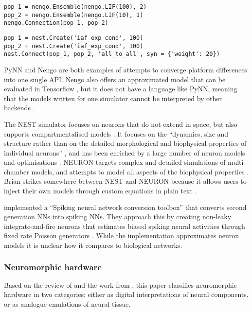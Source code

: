 \documentclass[report.tex]{subfiles}
\begin{document}
\begin{lstlisting}
pop_1 = nengo.Ensemble(nengo.LIF(100), 2)
pop_2 = nengo.Ensemble(nengo.LIF(10), 1)
nengo.Connection(pop_1, pop_2)
\end{lstlisting} \label{code:nengo}

\begin{lstlisting}
pop_1 = nest.Create('iaf_exp_cond', 100)
pop_2 = nest.Create('iaf_exp_cond', 100)
nest.Connect(pop_1, pop_2, 'all_to_all', syn = {'weight': 20})
\end{lstlisting} \label{code:nengo}

PyNN and Nengo are both examples of
attempts to converge platform differences into one single \gls{API}.
Nengo also offers an approximated model that can be evaluated in Tensorflow
\cite{Hunsberger2015}, but it does not have a language like PyNN, meaning
that the models written for one simulator cannot be interpreted by other
backends \cite{Nengo2018}.

The NEST simulator focuses on neurons that do not extend in space, 
but also supports compartmentalised models \cite{Gewaltig2007}.
It focuses on the ``dynamics, size and structure rather than on the detailed
morphological and biophysical properties of individual neurons''
\cite{Gewaltig2007}, and has been enriched by a large number of neuron models
and optimisations \cite{Blundell2018}.
NEURON targets complex and detailed simulations of multi-chamber models, and
attempts to model all aspects of the biophysical properties \cite{Carnevale2007}.
Brian strikes somewhere between NEST and NEURON because it allows users to
inject their own models through custom equations in plain text \cite{Goodman2013}.

\textcite{Rueckauer2017} implemented a ``Spiking neural network conversion
toolbox'' that converts second generation \gls{NN}s into
spiking \gls{NN}s.
They approach this by creating non-leaky integrate-and-fire
 neurons that estimates biased spiking neural activities through
fixed rate Poisson generators
\cite{Rueckauer2017}.
While the implementation approximates neuron models it is unclear
how it compares to biological networks.

\subsubsection{Neuromorphic hardware}
Based on the review of \textcite{Walter2015} and the work from
\cite{Lin2018}, this paper classifies neuromorphic hardware in two
categories: either as digital interpretations of neural components, 
or as analogue emulations of neural tissue.
\end{document}
